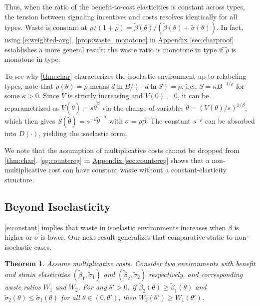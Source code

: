\documentclass[12 pt]{article}
\newcommand{\appendixref}[1]{\hyperref[#1]{Appendix \ref{#1}}}
\newtheorem{theorem}{Theorem}
\theoremstyle{remark}
\theoremstyle{definition}
\def\typemin{0}
\newcommand{\elaB}{\tilde\beta}   %
\newcommand{\elaS}{\tilde\sigma}  %
\newcommand{\elaR}{\tilde\rho}    %
\begin{document}

Thus, when the ratio of the benefit-to-cost elasticities is constant across types, the tension between signaling incentives and costs resolves identically for all types. Waste is constant at $\rho/(1+\rho) = \elaB(\theta) / (\elaB(\theta) + \elaS(\theta))$. In fact, using \autoref{e:weighted-avg}, \autoref{prop:waste_monotone} in \appendixref{sec:charproof} establishes a more general result: the waste ratio is monotone in type if $\elaR$ is monotone in type.

To see why \autoref{thm:char} characterizes the isoelastic environment up to relabeling types, note that $\elaR(\theta)=\rho$ means $d\ln B/(-d\ln S)=\rho$, i.e., $S = \kappa B^{-1/\rho}$ for some $\kappa > 0$. 
Since $V$ is strictly increasing and $V(\typemin)=0$, it can be reparametrized as $V(\tilde\theta) = s\tilde\theta^\beta$ via the change of variables $\tilde\theta = (V(\theta)/s)^{1/\beta}$, which then gives $S(\tilde\theta) = s^{-\rho}\tilde\theta^{-\sigma}$ with $\sigma = \rho\beta$. The constant $s^{-\rho}$ can be absorbed into $D(\cdot)$, yielding the isoelastic form.

We note that the assumption of multiplicative costs cannot be dropped from \autoref{thm:char}. \autoref{eg:countereg} in \appendixref{sec:countereg} shows that a non-multiplicative cost can have constant waste %
without a constant-elasticity structure.

\subsection{%
Beyond Isoelasticity}
\label{subsec:generalCS}

\autoref{e:constant} implies that waste in isoelastic environments increases when $\beta$ is higher or $\sigma$ is lower. Our next result generalizes that comparative static to non-isoelastic cases.

\begin{theorem}
\label{prop:comp_stat}
Assume multiplicative costs. Consider two environments with benefit and strain elasticities $(\elaB_1,\elaS_1)$ and $(\elaB_2,\elaS_2)$ respectively, and corresponding waste ratios $W_1$ and $W_2$. For any $\theta'>0$, if $\elaB_2(\theta)\geq\elaB_1(\theta)$ and $\elaS_2(\theta)\leq\elaS_1(\theta)$ for all $\theta\in(0,\theta')$, then $W_2(\theta') \geq W_1(\theta')$.
\end{theorem}
\end{document}
